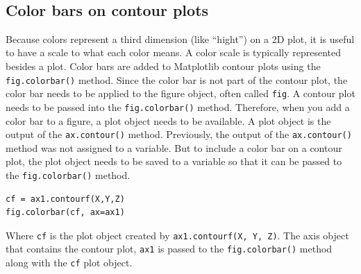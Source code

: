 \documentclass{book}
\begin{document}
    \begin{center}
    \end{center}
    { \hspace*{\fill} \\}
    

    
        \subsection{Color bars on contour
plots}\label{color-bars-on-contour-plots}
    




    
        Because colors represent a third dimension (like ``hight'') on a 2D
plot, it is useful to have a scale to what each color means. A color
scale is typically represented besides a plot. Color bars are added to
Matplotlib contour plots using the \lstinline!fig.colorbar()! method.
Since the color bar is not part of the contour plot, the color bar needs
to be applied to the figure object, often called \lstinline!fig!. A
contour plot needs to be passed into the \lstinline!fig.colorbar()!
method. Therefore, when you add a color bar to a figure, a plot object
needs to be available. A plot object is the output of the
\lstinline!ax.contour()! method. Previously, the output of the
\lstinline!ax.contour()! method was not assigned to a variable. But to
include a color bar on a contour plot, the plot object needs to be saved
to a variable so that it can be passed to the \lstinline!fig.colorbar()!
method.

\begin{lstlisting}
cf = ax1.contourf(X,Y,Z)
fig.colorbar(cf, ax=ax1)
\end{lstlisting}

Where \lstinline!cf! is the plot object created by
\lstinline!ax1.contourf(X, Y, Z)!. The axis object that contains the
contour plot, \lstinline!ax1! is passed to the
\lstinline!fig.colorbar()! method along with the \lstinline!cf! plot
object.
    
\end{document}
